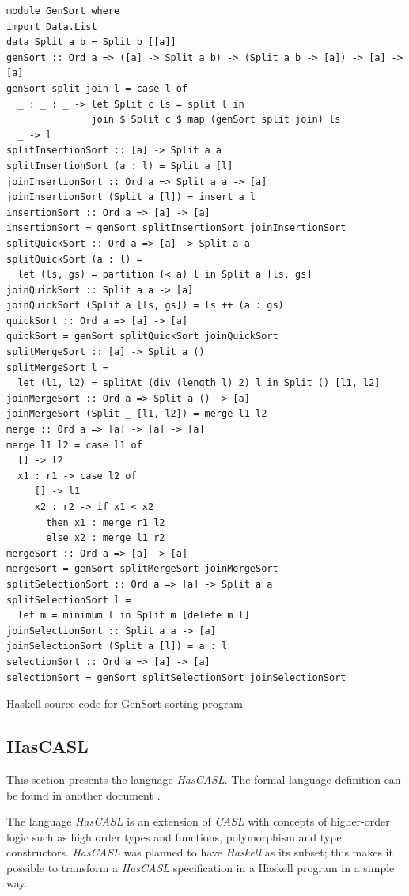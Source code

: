 \documentclass[12pt,twoside]{article}
\numberwithin{spec}{subsection}
\numberwithin{proof}{subsection}
\numberwithin{figure}{subsection}
\numberwithin{code}{subsection}
\begin{document}
\begin{code}\capstart
\footnotesize
\begin{verbatim}
module GenSort where
import Data.List
data Split a b = Split b [[a]]
genSort :: Ord a => ([a] -> Split a b) -> (Split a b -> [a]) -> [a] -> [a]
genSort split join l = case l of
  _ : _ : _ -> let Split c ls = split l in
               join $ Split c $ map (genSort split join) ls
  _ -> l
splitInsertionSort :: [a] -> Split a a
splitInsertionSort (a : l) = Split a [l]
joinInsertionSort :: Ord a => Split a a -> [a]
joinInsertionSort (Split a [l]) = insert a l
insertionSort :: Ord a => [a] -> [a]
insertionSort = genSort splitInsertionSort joinInsertionSort
splitQuickSort :: Ord a => [a] -> Split a a
splitQuickSort (a : l) =
  let (ls, gs) = partition (< a) l in Split a [ls, gs]
joinQuickSort :: Split a a -> [a]
joinQuickSort (Split a [ls, gs]) = ls ++ (a : gs)
quickSort :: Ord a => [a] -> [a]
quickSort = genSort splitQuickSort joinQuickSort
splitMergeSort :: [a] -> Split a ()
splitMergeSort l =
  let (l1, l2) = splitAt (div (length l) 2) l in Split () [l1, l2]
joinMergeSort :: Ord a => Split a () -> [a]
joinMergeSort (Split _ [l1, l2]) = merge l1 l2
merge :: Ord a => [a] -> [a] -> [a]
merge l1 l2 = case l1 of
  [] -> l2
  x1 : r1 -> case l2 of
     [] -> l1
     x2 : r2 -> if x1 < x2
       then x1 : merge r1 l2
       else x2 : merge l1 r2
mergeSort :: Ord a => [a] -> [a]
mergeSort = genSort splitMergeSort joinMergeSort
splitSelectionSort :: Ord a => [a] -> Split a a
splitSelectionSort l =
  let m = minimum l in Split m [delete m l]
joinSelectionSort :: Split a a -> [a]
joinSelectionSort (Split a [l]) = a : l
selectionSort :: Ord a => [a] -> [a]
selectionSort = genSort splitSelectionSort joinSelectionSort
\end{verbatim}
\caption{Haskell source code for GenSort sorting program}
\label{haskellcode}
\end{code}

\subsection{HasCASL}
This section presents the language \textit{HasCASL}\citep{SchroderMossakowski02}. The formal language definition can be found in another document \citep{SchroderEtAl03}.

The language \textit{HasCASL} is an extension of \textit{CASL} with concepts of higher-order logic such as high order types and functions, polymorphism and type constructors. \textit{HasCASL} was planned to have \textit{Haskell} as its subset; this makes it possible to transform a \textit{HasCASL} specification in a Haskell program in a simple way.
\end{document}
